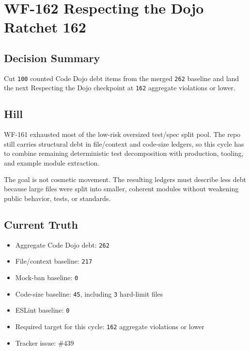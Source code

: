 \chapter{WF-162 Respecting the Dojo Ratchet 162}\label{record-244}

\smallskip

\section{Decision Summary}\label{record-244-decision-summary}

Cut \texttt{1\allowbreak{}0\allowbreak{}0} counted Code Dojo debt items from the merged \texttt{2\allowbreak{}6\allowbreak{}2} baseline and land the next Respecting the Dojo checkpoint at \texttt{1\allowbreak{}6\allowbreak{}2} aggregate violations or lower.

\section{Hill}\label{record-244-hill}

WF-161 exhausted most of the low-risk oversized test/spec split pool. The repo still carries structural debt in file/context and code-size ledgers, so this cycle has to combine remaining deterministic test decomposition with production, tooling, and example module extraction.

The goal is not cosmetic movement. The resulting ledgers must describe less debt because large files were split into smaller, coherent modules without weakening public behavior, tests, or standards.

\section{Current Truth}\label{record-244-current-truth}

\begin{itemize}
\tightlist
\item
  Aggregate Code Dojo debt: \texttt{2\allowbreak{}6\allowbreak{}2}
\item
  File/context baseline: \texttt{2\allowbreak{}1\allowbreak{}7}
\item
  Mock-ban baseline: \texttt{0}
\item
  Code-size baseline: \texttt{4\allowbreak{}5}, including \texttt{3} hard-limit files
\item
  ESLint baseline: \texttt{0}
\item
  Required target for this cycle: \texttt{1\allowbreak{}6\allowbreak{}2} aggregate violations or lower
\item
  Tracker issue: \#439
\end{itemize}

